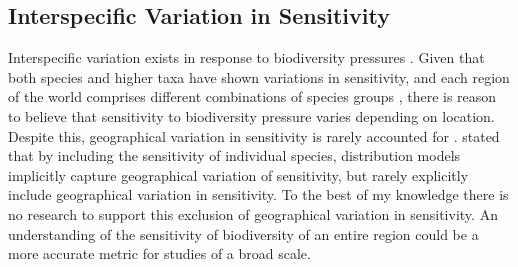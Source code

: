 \documentclass[11pt, a4paper, titlepage]{article}
\begin{document}
   	\subsection*{Interspecific Variation in Sensitivity}
   	 Interspecific variation exists in response to biodiversity pressures \citep{foden2013identifying}. Given that both species and higher taxa \citep{sunday2015species} have shown variations in sensitivity, and each region of the world comprises different combinations of species groups \citep{goethem2021biodiversity}, there is reason to believe that sensitivity to biodiversity pressure varies depending on location. Despite this, geographical variation in sensitivity is rarely accounted for \citep{newbold2020tropical, sala2000global}. \cite{newbold2020tropical} stated that by including the sensitivity of individual species, distribution models implicitly capture geographical variation of sensitivity, but rarely explicitly include geographical variation in sensitivity. To the best of my knowledge there is no research to support this exclusion of geographical variation in sensitivity. An understanding of the sensitivity of biodiversity of an entire region could be a more accurate metric for studies of a broad scale. \newline
   	 
\end{document}
